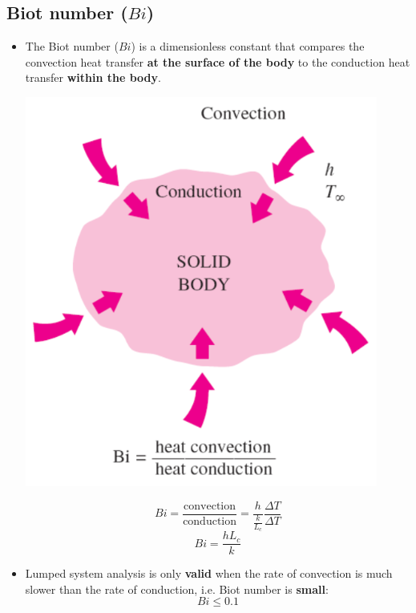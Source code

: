 \documentclass[11pt]{article}
\begin{document}
\subsection{Biot number (\(Bi\))}
\label{sec:org65cf91e}
\begin{itemize}
\item The Biot number (\(Bi\)) is a dimensionless constant that compares the convection heat transfer \textbf{at the surface of the body} to the conduction heat transfer \textbf{within the body}.
\begin{center}
\includegraphics[width=.9\linewidth]{./images/biot-number-diagram.png}
\end{center}
\[Bi = \frac{\text{convection}}{\text{conduction}} = \frac{h}{\frac{k}{L_c}} \frac{\Delta T}{\Delta T}\]
\[Bi = \frac{hL_c}{k}\]
\item Lumped system analysis is only \textbf{valid} when the rate of convection is much slower than the rate of conduction, i.e. Biot number is \textbf{small}:
\[Bi \le 0.1\]
\end{itemize}
\end{document}
